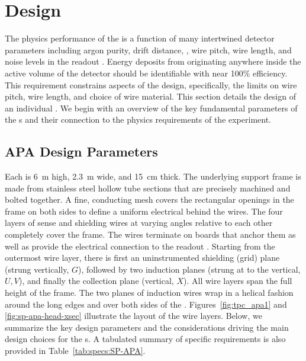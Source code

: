 \section{Design}
\label{sec:fdsp-apa-design}

The physics performance of the  is a function of many intertwined detector parameters including argon purity, drift distance, \efield, wire pitch, wire length, and noise levels in the readout .  Energy deposits from  originating anywhere inside the active volume of the detector should be identifiable with near \num{100}\% efficiency.  This requirement constrains aspects of the  design, specifically, the limits on wire pitch, wire length, and choice of wire material.  This section details the design of an individual . We begin with an overview of the key fundamental parameters of the s and their connection to the physics requirements of the  experiment. 


\subsection{APA Design Parameters}
\label{sec:fdsp-apa-design-overview}

Each  is \SI{6}{m} high, \SI{2.3}{m} wide, and \SI{15}{cm} thick.  The underlying support frame is made from stainless steel hollow tube sections that are precisely machined and bolted together. A fine, conducting mesh covers the rectangular openings in the frame on both sides to define a uniform electrical  behind the wires. The four layers of sense and shielding wires at varying angles relative to each other completely cover the frame. The wires terminate on boards that anchor them as well as provide the electrical connection to the  readout . Starting from the outermost wire layer, there is first an uninstrumented shielding (grid) plane (strung vertically, $G$), followed by two induction planes (strung at \apainducwireangle to the vertical, $U,V$), and finally the collection plane (vertical, $X$). All wire layers span the full height of the  frame. The two planes of induction wires wrap in a helical fashion around the long edges and over both sides of the . Figures~\ref{fig:tpc_apa1} and \ref{fig:sp-apa-head-xsec} illustrate the layout of the wire layers.  Below, we summarize the key design parameters and the considerations driving the main design choices for the s.  A tabulated summary of  specific requirements is also provided in Table~\ref{tab:specs:SP-APA}.  


